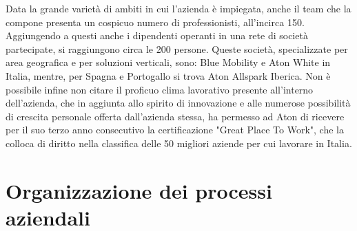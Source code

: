 
Data la grande varietà di ambiti in cui l'azienda è impiegata, anche il team che la compone presenta un cospicuo numero di professionisti, all'incirca 150. 
Aggiungendo a questi anche i dipendenti operanti in una rete di società partecipate, si raggiungono circa le 200 persone. 
Queste società, specializzate per area geografica e per soluzioni verticali, sono: ​Blue Mobility e Aton White in Italia,
mentre, per Spagna e Portogallo si trova Aton Allspark Iberica.
Non è possibile infine non citare il proficuo clima lavorativo presente all'interno dell'azienda, che in aggiunta allo spirito di innovazione e alle numerose possibilità di crescita personale
offerta dall'azienda stessa, ha permesso ad Aton di ricevere per il suo terzo anno consecutivo la certificazione "Great Place To Work", che la colloca di diritto
nella classifica delle 50 migliori aziende per cui lavorare in Italia.



\section{Organizzazione dei processi aziendali}

